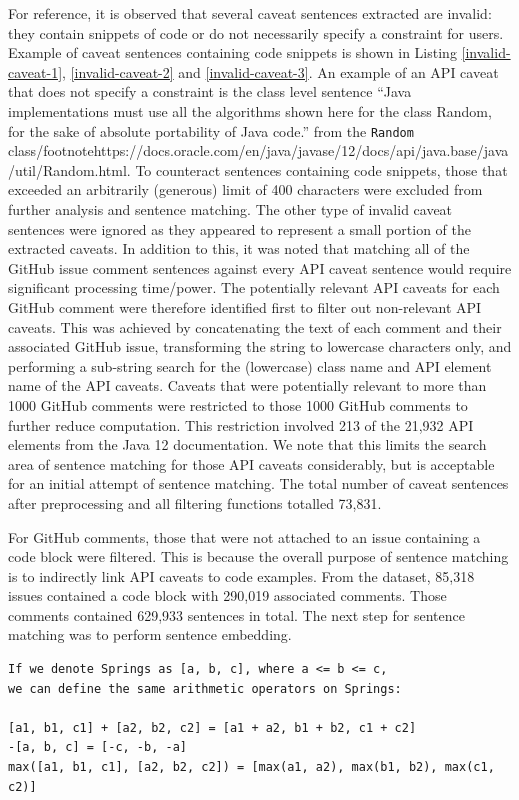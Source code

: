 For reference, it is observed that several caveat sentences extracted are invalid: they contain snippets of code or do not necessarily specify a constraint for users. Example of caveat sentences containing code snippets is shown in Listing \ref{invalid-caveat-1}, \ref{invalid-caveat-2} and \ref{invalid-caveat-3}. An example of an API caveat that does not specify a constraint is the class level sentence ``Java implementations must use all the algorithms shown here for the class Random, for the sake of absolute portability of Java code.'' from the \lstinline{Random} class/footnote{https://docs.oracle.com/en/java/javase/12/docs/api/java.base/java/util/Random.html}. To counteract sentences containing code snippets, those that exceeded an arbitrarily (generous) limit of 400 characters were excluded from further analysis and sentence matching. The other type of invalid caveat sentences were ignored as they appeared to represent a small portion of the extracted caveats.
In addition to this, it was noted that matching all of the GitHub issue comment sentences against every API caveat sentence would require significant processing time/power. The potentially relevant API caveats for each GitHub comment were therefore identified first to filter out non-relevant API caveats. This was achieved by concatenating the text of each comment and their associated GitHub issue, transforming the string to lowercase characters only, and performing a sub-string search for the (lowercase) class name and API element name of the API caveats. Caveats that were potentially relevant to more than 1000 GitHub comments were restricted to those 1000 GitHub comments to further reduce computation. This restriction involved 213 of the 21,932 API elements from the Java 12 documentation. We note that this limits the search area of sentence matching for those API caveats considerably, but is acceptable for an initial attempt of sentence matching. The total number of caveat sentences after preprocessing and all filtering  functions totalled 73,831.\bigbreak

For GitHub comments, those that were not attached to an issue containing a code block were filtered. This is because the overall purpose of sentence matching is to indirectly link API caveats to code examples. From the dataset, 85,318 issues contained a code block with  290,019 associated comments. Those comments contained 629,933 sentences in total. The next step for sentence matching was to perform sentence embedding.

\begin{lstlisting}[label=invalid-caveat-1,caption={An example of a caveat sentence extracted from the \lstinline{javax.swing.Spring} documentation containing some snippets of code or mathematical expressions},float,frame=tb,numbers=none,language=None,linebackgroundcolor={\lstcolorlines{4,5,6}}]
If we denote Springs as [a, b, c], where a <= b <= c, 
we can define the same arithmetic operators on Springs:

[a1, b1, c1] + [a2, b2, c2] = [a1 + a2, b1 + b2, c1 + c2]
-[a, b, c] = [-c, -b, -a]
max([a1, b1, c1], [a2, b2, c2]) = [max(a1, a2), max(b1, b2), max(c1, c2)]
\end{lstlisting}

